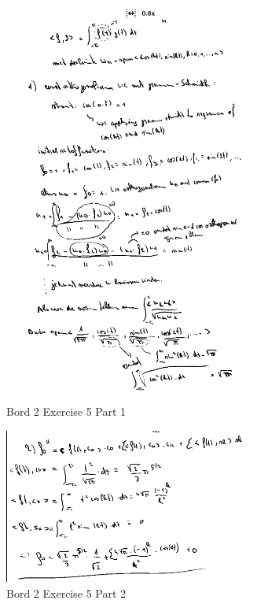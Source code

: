 \documentclass[a4paper]{report}
\begin{document}
\begin{figure}[H]
	\centering
	\includegraphics[width=0.8\textwidth]{assets/bord_2_ex_5_part_1.png}
	\caption{Bord 2 Exercise 5 Part 1}
	\label{fig:bord_2_ex_5_part_1}
\end{figure}


\begin{figure}[H]
	\centering
	\includegraphics[width=0.8\textwidth]{assets/bord_2_ex_5_part_2.png}
	\caption{Bord 2 Exercise 5 Part 2}
	\label{fig:bord_2_ex_5_part_2}
\end{figure}
\end{document}
